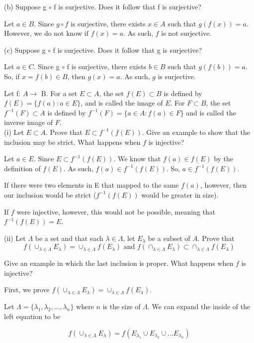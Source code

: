 \documentclass[addpoints]{exam}
\begin{document}
\begin{questions}
(b) Suppose g $\circ$ f is surjective. Does it follow that f is surjective?

Let $a \in B$. Since $g \circ f$ is surjective, there exists $x \in A$ such that $g(f(x)) = a$. However, 
we do not know if $f(x) = a$. As such, $f$ is not surjective. 

(c) Suppose g $\circ$ f is surjective. Does it follow that g is surjective?

Let $a \in C$. Since g $\circ$ f is surjective, there exists $b \in B$ such that $g(f(b)) = a$. So, 
if $x = f(b) \in B$, then $g(x) = a$. As such, $g$ is surjective.

\question Let f: $A \rightarrow$ B. For a set $E \subset A$, the set $f(E) \subset B$ is defined by $f(E) = \{f(a): a \in E\}$, and 
is called the image of $E$. For $F \subset B$, the set $f^{-1}(F) \subset A$ is defined by $f^{-1}(F) = \{a \in A: f(a) \in F\}$ and is 
called the inverse image of $F$. \\
(i) Let $E \subset A$. Prove that $E \subset f^{-1}(f(E))$. Give an example to show that the inclusion may be strict. 
What happens when $f$ is injective? 

Let $a \in E$. Since $E \subset f^{-1}(f(E))$. We know that $f(a) \in f(E)$ by the definition of $f(E)$. As such, 
$f(a) \in f^{-1}(f(E))$. So, $a \in f^{-1}(f(E))$. 

If there were two elements in E that mapped to the same $f(a)$, however, then our inclusion would be strict ($f^{-1}(f(E))$ would be greater in size).

If $f$ were injective, however, this would not be possible, meaning that $f^{-1}(f(E)) = E$.

(ii) Let $\Lambda$ be a set and that each $\lambda \in \Lambda$, let $E_{\lambda}$ be a subset of $A$. Prove that 
\[f(\cup_{\lambda \in \Lambda}E_{\lambda}) = \cup_{\lambda \in \Lambda} f(E_\lambda) \text{ and } f(\cap_{\lambda \in \Lambda}E_{\lambda})
\subset \cap_{\lambda \in \Lambda}f(E_\lambda)\]

Give an example in which the last inclusion is proper. What happens when $f$ is injective?

First, we prove $f(\cup_{\lambda \in \Lambda}E_{\lambda}) = \cup_{\lambda \in \Lambda} f(E_\lambda)$. 

Let $\Lambda = \{\lambda_1, \lambda_2, ..., \lambda_n\}$ where $n$ is the size of $\Lambda$. We can expand the inside of the left equation to be

\[f(\cup_{\lambda \in \Lambda}E_{\lambda}) = f(E_{\lambda_1} \cup E_{\lambda_2} \cup ... E_{\lambda_n})\]


\end{questions}
\end{document}
